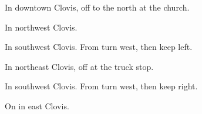 
\begin{LocationList}

In downtown Clovis, off   to the north at the church.

In northwest Clovis.

In southwest Clovis.
From  turn west, then keep left.

In northeast Clovis, off    at the truck stop.

In southwest Clovis.
From  turn west, then keep right.

\Location{\TruckStop \Gas \Rest \Service}
On    in east Clovis.

\end{LocationList}
